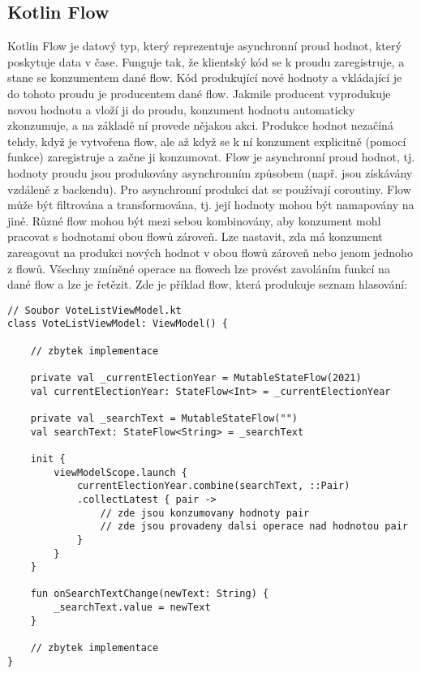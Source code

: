 \subsection*{Kotlin Flow}
Kotlin Flow \cite{kotlinflow} je datový typ, který reprezentuje asynchronní proud hodnot, který poskytuje data v čase. Funguje tak, že klientský kód se k proudu zaregistruje, a stane se konzumentem dané flow. Kód produkující nové hodnoty a vkládající je do tohoto proudu je producentem dané flow. Jakmile producent vyprodukuje novou hodnotu a vloží ji do proudu, konzument hodnotu automaticky zkonzumuje, a na základě ní provede nějakou akci. Produkce hodnot nezačíná \linebreak tehdy, když je vytvořena flow, ale až když se k ní konzument explicitně (pomocí funkce) zaregistruje a začne ji konzumovat. Flow je asynchronní proud hodnot, tj. hodnoty proudu jsou produkovány asynchronním způsobem (např. jsou získávány vzdáleně z backendu). Pro asynchronní produkci dat se používají coroutiny. Flow může být filtrována a transformována, tj. její hodnoty mohou být namapovány na jiné. Různé flow mohou být mezi sebou kombinovány, aby konzument mohl pracovat s hodnotami obou flowů zároveň. Lze nastavit, zda má konzument zareagovat na produkci nových hodnot v obou flowů zároveň nebo jenom jednoho z flowů. Všechny zmíněné operace na flowech lze provést zavoláním funkcí na dané flow a lze je řetězit. Zde je příklad flow, která produkuje seznam hlasování:

\begin{lstlisting}[caption={Příklad použití flow}, label={lst:flow-general}, tabsize=2]
// Soubor VoteListViewModel.kt
class VoteListViewModel: ViewModel() {
	
	// zbytek implementace
	
	private val _currentElectionYear = MutableStateFlow(2021)	
	val currentElectionYear: StateFlow<Int> = _currentElectionYear
	
	private val _searchText = MutableStateFlow("")
	val searchText: StateFlow<String> = _searchText
	
	init {
		viewModelScope.launch {
			currentElectionYear.combine(searchText, ::Pair)
			.collectLatest { pair ->
				// zde jsou konzumovany hodnoty pair
				// zde jsou provadeny dalsi operace nad hodnotou pair
			}
		}
	}

	fun onSearchTextChange(newText: String) {
		_searchText.value = newText
	}

	// zbytek implementace
}
\end{lstlisting}

